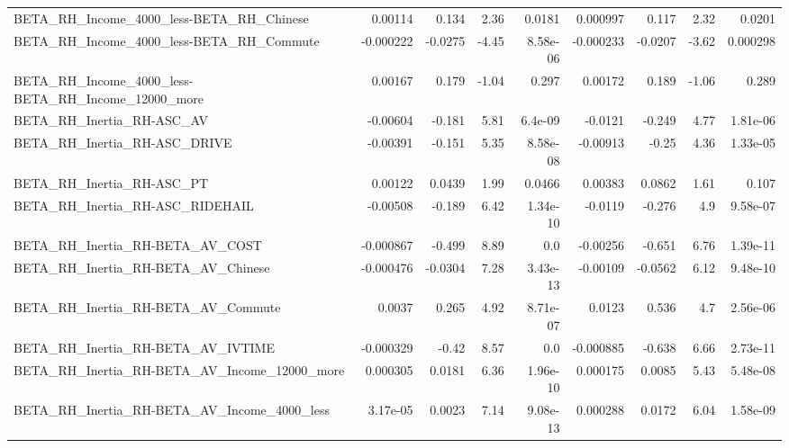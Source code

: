 \begin{tabular}{lrrrrrrrr}
BETA\_RH\_Income\_4000\_less-BETA\_RH\_Chinese           &     0.00114 &        0.134 &     2.36 &   0.0181 &   0.000997 &       0.117 &         2.32 &        0.0201 \\
BETA\_RH\_Income\_4000\_less-BETA\_RH\_Commute           &   -0.000222 &      -0.0275 &    -4.45 & 8.58e-06 &  -0.000233 &     -0.0207 &        -3.62 &      0.000298 \\
BETA\_RH\_Income\_4000\_less-BETA\_RH\_Income\_12000\_more &     0.00167 &        0.179 &    -1.04 &    0.297 &    0.00172 &       0.189 &        -1.06 &         0.289 \\
BETA\_RH\_Inertia\_RH-ASC\_AV                          &    -0.00604 &       -0.181 &     5.81 &  6.4e-09 &    -0.0121 &      -0.249 &         4.77 &      1.81e-06 \\
BETA\_RH\_Inertia\_RH-ASC\_DRIVE                       &    -0.00391 &       -0.151 &     5.35 & 8.58e-08 &   -0.00913 &       -0.25 &         4.36 &      1.33e-05 \\
BETA\_RH\_Inertia\_RH-ASC\_PT                          &     0.00122 &       0.0439 &     1.99 &   0.0466 &    0.00383 &      0.0862 &         1.61 &         0.107 \\
BETA\_RH\_Inertia\_RH-ASC\_RIDEHAIL                    &    -0.00508 &       -0.189 &     6.42 & 1.34e-10 &    -0.0119 &      -0.276 &          4.9 &      9.58e-07 \\
BETA\_RH\_Inertia\_RH-BETA\_AV\_COST                    &   -0.000867 &       -0.499 &     8.89 &      0.0 &   -0.00256 &      -0.651 &         6.76 &      1.39e-11 \\
BETA\_RH\_Inertia\_RH-BETA\_AV\_Chinese                 &   -0.000476 &      -0.0304 &     7.28 & 3.43e-13 &   -0.00109 &     -0.0562 &         6.12 &      9.48e-10 \\
BETA\_RH\_Inertia\_RH-BETA\_AV\_Commute                 &      0.0037 &        0.265 &     4.92 & 8.71e-07 &     0.0123 &       0.536 &          4.7 &      2.56e-06 \\
BETA\_RH\_Inertia\_RH-BETA\_AV\_IVTIME                  &   -0.000329 &        -0.42 &     8.57 &      0.0 &  -0.000885 &      -0.638 &         6.66 &      2.73e-11 \\
BETA\_RH\_Inertia\_RH-BETA\_AV\_Income\_12000\_more       &    0.000305 &       0.0181 &     6.36 & 1.96e-10 &   0.000175 &      0.0085 &         5.43 &      5.48e-08 \\
BETA\_RH\_Inertia\_RH-BETA\_AV\_Income\_4000\_less        &    3.17e-05 &       0.0023 &     7.14 & 9.08e-13 &   0.000288 &      0.0172 &         6.04 &      1.58e-09 \\

\end{tabular}
